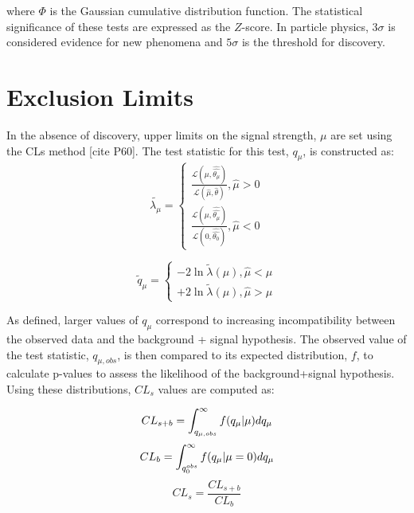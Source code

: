 where $\Phi$ is the Gaussian cumulative distribution function. The statistical significance of these tests are expressed as the $Z$-score. In particle physics, $3\sigma$ is considered evidence for new phenomena and $5\sigma$ is the threshold for discovery. 
\section{Exclusion Limits}
In the absence of discovery, upper limits on the signal strength, $\mu$ are set using the CLs method [cite P60]. The test statistic for this test, $q_{\mu}$, is constructed as:
\begin{equation}
\tilde{\lambda_{\mu}}=\left\{ \begin{array}{ll}
\frac{\mathcal{L}(\mu,\hat{\hat{\theta_{\mu}}})}{\mathcal{L}(\hat{\mu},\hat{\theta})},  \hat{\mu} > 0\\
\frac{\mathcal{L}(\mu,\hat{\hat{\theta_{\mu}}})}{\mathcal{L}(0,\hat{\hat{\theta_{0}}})},  \hat{\mu} < 0
\end{array} 
\right.
\end{equation}
 
 \begin{equation}
\tilde{q}_{\mu}=\left\{ \begin{array}{ll}
-2\ln \tilde{\lambda}(\mu),  \hat{\mu} < \mu \\
+2\ln \tilde{\lambda}(\mu),  \hat{\mu} > \mu 
\end{array}
\right.
\end{equation}
 
As defined, larger values of $q_{\mu}$ correspond to increasing incompatibility between the observed data and the background + signal hypothesis. The observed value of the test statistic, $q_{\mu, obs}$, is then compared to its expected distribution, $f$, to calculate p-values to assess the likelihood of the background+signal hypothesis. Using these distributions, $CL_{s}$ values are computed as:
 
 \begin{equation}
 CL_{s+b}=\int_{q_{\mu, obs}}^{\infty}f(q_{\mu}|\mu)dq_{\mu}\\
 \end{equation}
  \begin{equation}
CL_{b}=\int_{q_{0}^{obs}}^{\infty}f(q_{\mu}|\mu=0)dq_{\mu}\\
 \end{equation}
  \begin{equation}
CL_{s}=\frac{CL_{s+b}}{CL_{b}}
 \end{equation}

